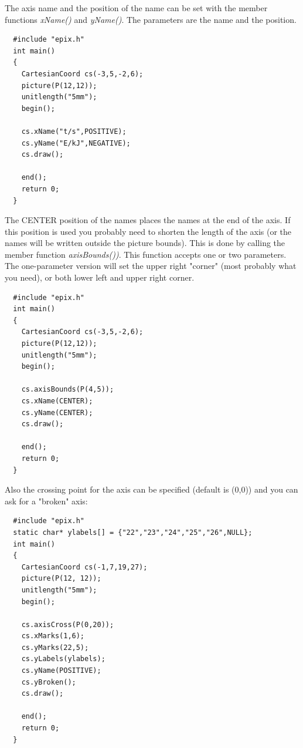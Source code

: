 \documentclass[12pt,a4paper]{article}
\begin{document}
  The axis name and the position of the name can be set with the member
  functions \textit{xName()} and \textit{yName()}. The parameters are the
  name and the position.%

  \begin{minipage}{7.5cm}
    \begin{lstlisting}
  #include "epix.h"
  int main()
  {
    CartesianCoord cs(-3,5,-2,6);
    picture(P(12,12));
    unitlength("5mm");
    begin();

    cs.xName("t/s",POSITIVE);
    cs.yName("E/kJ",NEGATIVE);
    cs.draw();

    end();
    return 0;
  }
    \end{lstlisting}
  \end{minipage}
  \begin{minipage}{5.5cm}
    
  \end{minipage}

  The CENTER position of the names places the names at the end of the
  axis. If this position is used you probably need to shorten the
  length of the axis (or the names will be written outside the picture
  bounds). This is done by calling the member function
  \textit{axisBounds())}. This function accepts one or two
  parameters. The one-parameter version will set the upper right
  "corner" (most probably what you need), or both lower left and upper
  right corner.

  \begin{minipage}{7.5cm}
    \begin{lstlisting}
  #include "epix.h"
  int main()
  {
    CartesianCoord cs(-3,5,-2,6);
    picture(P(12,12));
    unitlength("5mm");
    begin();

    cs.axisBounds(P(4,5));
    cs.xName(CENTER);
    cs.yName(CENTER);
    cs.draw();

    end();
    return 0;
  }
    \end{lstlisting}
  \end{minipage}
  \begin{minipage}{5.5cm}
    
  \end{minipage}

  Also the crossing point for the axis can be specified (default is
  (0,0)) and you can ask for a "broken" axis:

  \begin{minipage}{7.5cm}
    \begin{lstlisting}
  #include "epix.h"
  static char* ylabels[] = {"22","23","24","25","26",NULL};
  int main()
  {
    CartesianCoord cs(-1,7,19,27);
    picture(P(12, 12));
    unitlength("5mm");
    begin();

    cs.axisCross(P(0,20));
    cs.xMarks(1,6);
    cs.yMarks(22,5);
    cs.yLabels(ylabels);
    cs.yName(POSITIVE);
    cs.yBroken();
    cs.draw();

    end();
    return 0;
  }
    \end{lstlisting}
  \end{minipage}
  \begin{minipage}{5.5cm}
    \vspace{1.0cm}
    
  \end{minipage}
\end{document}
